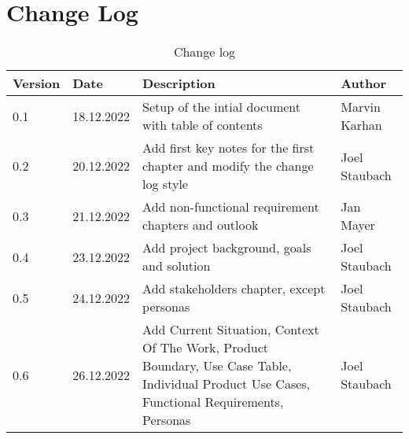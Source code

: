 \chapter{Change Log}

\sffamily
\begin{footnotesize}
  \renewcommand{\arraystretch}{1.4}
  \begin{longtable}[L L L L]{ p{} p{} p{} p{} }
    \caption                       %
    {Change log} %
    \\
    \toprule
    \textbf{Version} & \textbf{Date} & \textbf{Description}                                                                                                                          & \textbf{Author} \\
    \midrule
    0.1              & 18.12.2022    & Setup of the intial document with table of contents                                                                                           & Marvin Karhan   \\

    \rowcolor{Gray}
    0.2              & 20.12.2022    & Add first key notes for the first chapter and modify the change log style                                                                     & Joel Staubach   \\

    0.3              & 21.12.2022    & Add non-functional requirement chapters and outlook                                                                                           & Jan Mayer       \\

    \rowcolor{Gray}
    0.4              & 23.12.2022    & Add project background, goals and solution                                                                                                    & Joel Staubach   \\

    0.5              & 24.12.2022    & Add stakeholders chapter, except personas                                                                                                     & Joel Staubach   \\

    \rowcolor{Gray}
    0.6              & 26.12.2022    & Add Current Situation, Context Of The Work, Product Boundary, Use Case Table, Individual Product Use Cases, Functional Requirements, Personas & Joel Staubach   \\


\end{longtable}
\end{footnotesize}
